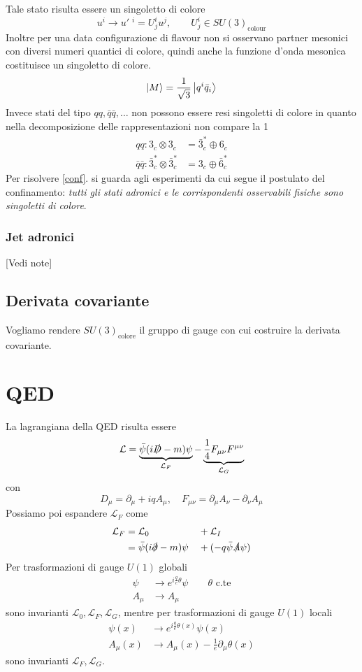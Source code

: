 \documentclass[10pt,a4paper]{article}
\theoremstyle{definition}
\newcommand{\lagr}{\mathcal{L}}
\begin{document}
Tale stato risulta essere un singoletto di colore 
\[
u^i \to u'\phantom{.}^i = U^i_j u^j,\qquad U^i_j \in SU(3)_{\text{colour}}    
\]
Inoltre per una data configurazione di flavour non si osservano partner mesonici con diversi numeri quantici di colore, quindi anche la funzione d'onda mesonica costituisce un singoletto di colore.
\[
\ket{M} = \frac{1}{\sqrt{3}}\ket{q^i \bar{q}_i}    
\]
Invece stati del tipo $qq, \bar{q}\bar{q}, \dots$ non possono essere resi singoletti di colore in quanto nella decomposizione delle rappresentazioni non compare la 1
\begin{align*}
    qq: 3_c \otimes 3_c &= \bar{3}^*_c \oplus 6_c \\
    \bar{q}\bar{q}: \bar{3}^*_c \otimes \bar{3}^*_c &= 3_c \oplus \bar{6}^*_c
\end{align*}
Per risolvere \ref*{conf}. si guarda agli esperimenti da cui segue il postulato del confinamento: \textit{tutti gli stati adronici e le corrispondenti osservabili fisiche sono singoletti di colore}.

\subsubsection{Jet adronici}
[Vedi note]

\subsection{Derivata covariante}
Vogliamo rendere $SU(3)_{\text{colore}}$ il gruppo di gauge con cui costruire la derivata covariante.

\section{QED}
La lagrangiana della QED risulta essere
\[
    \lagr = \underbrace{\bar{\psi}(i\slashed{D}- m)\psi}_{\lagr_F} - \underbrace{\frac14 F_{\mu \nu}F^{\mu \nu}}_{\lagr_G}
\]
con
\[
D_\mu = \partial_\mu + iqA_\mu, \quad F_{\mu \nu} = \partial_\mu A_\nu - \partial_\nu A_\mu    
\]
Possiamo poi espandere $\lagr_F$ come
\begin{alignat*}{3}
    \lagr_F &= \lagr_0 &&+ \lagr_I \\
    &= \bar{\psi}(i\slashed{\partial}-m)\psi &&+ (-q\bar{\psi}\slashed{A}\psi)
\end{alignat*}
Per trasformazioni di gauge $U(1)$ globali
\begin{align*}
    \psi &\to e^{i\frac{q}{e}\theta}\psi \qquad \theta \text{ c.te} \\
    A_\mu &\to A_\mu
\end{align*}
sono invarianti $\lagr_0, \lagr_F, \lagr_G$, mentre per trasformazioni di gauge $U(1)$ locali
\begin{align*}
    \psi(x) &\to e^{i\frac{q}{e}\theta(x)}\psi(x)\\
    A_\mu(x) &\to A_\mu(x) - \frac{1}{e}\partial_\mu\theta(x)
\end{align*}
sono invarianti $\lagr_F, \lagr_G$.
\end{document}
